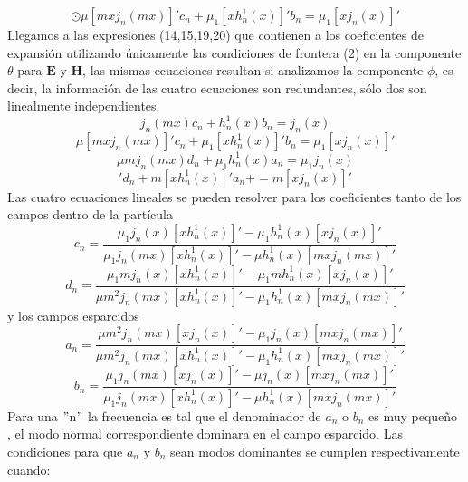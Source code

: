 \documentclass[11pt]{article}
\begin{document}
\begin{equation}
\odot \mu [mxj_{n}(mx)]'c_{n}+\mu_{1}[xh_{n}^{1}(x)]'b_{n}=\mu_{1}[xj_{n}(x)]'
\end{equation}
Llegamos a las expresiones (14,15,19,20) que contienen a los coeficientes de expansión utilizando únicamente las condiciones de frontera (2) en la componente $\theta$ para $\textbf{E}$ y $\textbf{H}$, las mismas ecuaciones resultan si analizamos la componente $\phi$, es decir, la información de las cuatro ecuaciones son redundantes, sólo dos son linealmente independientes.
\begin{equation*}
j_{n}(mx)c_{n}+h_{n}^{1}(x)b_{n}=j_{n}(x)
\end{equation*}
\begin{equation*}
\mu [mxj_{n}(mx)]'c_{n}+\mu_{1}[xh_{n}^{1}(x)]'b_{n}=\mu_{1}[xj_{n}(x)]'
\end{equation*}
\begin{equation*}
\mu mj_{n}(mx)d_{n}+\mu_{1}h_{n}^{1}(x)a_{n}=\mu_{1}j_{n}(x)
\end{equation*}
\begin{equation*}
[mxj_{n}(mx)]'d_{n}+m[xh_{n}^{1}(x)]'a_{n}+
=m[xj_{n}(x)]'
\end{equation*}
Las cuatro ecuaciones lineales  se pueden resolver para los coeficientes tanto de los campos dentro de la partícula
\begin{equation}
c_{n}=\frac{\mu_{1}j_{n}(x)[xh_{n}^{1}(x)]'-\mu_{1}h_{n}^{1}(x)[xj_{n}(x)]'}{\mu_{1}j_{n}(mx)[xh_{n}^{1}(x)]'-\mu h_{n}^{1}(x)[mxj_{n}(mx)]'}
\end{equation}
\begin{equation}
d_{n}=\frac{\mu_{1}mj_{n}(x)[xh_{n}^{1}(x)]'-\mu_{1}mh_{n}^{1}(x)[xj_{n}(x)]'}{\mu m^{2}j_{n}(mx)[xh_{n}^{1}(x)]'-\mu_{1} h_{n}^{1}(x)[mxj_{n}(mx)]'}
\end{equation}
y los campos esparcidos
\begin{equation}
a_{n}=\frac{\mu m^{2}j_{n}(mx)[xj_{n}(x)]'-\mu_{1} j_{n}(x)[mxj_{n}(mx)]'}{\mu m^{2}j_{n}(mx)[xh_{n}^{1}(x)]'-\mu_{1} h_{n}^{1}(x)[mxj_{n}(mx)]'}
\end{equation}
\begin{equation}
b_{n}= \frac{\mu_{1} j_{n}(mx)[xj_{n}(x)]'-\mu j_{n}(x)[mxj_{n}(mx)]'}{\mu_{1}j_{n}(mx)[xh_{n}^{1}(x)]'-\mu h_{n}^{1}(x)[mxj_{n}(mx)]'}
\end{equation}
Para una $"$n$"$ la frecuencia es tal que el denominador de $a_{n}$ o $b_{n}$ es muy pequeño , el modo normal correspondiente dominara en el campo esparcido. Las condiciones para que $a_{n}$ y $b_{n}$ sean modos dominantes se cumplen respectivamente cuando:
\end{document}
